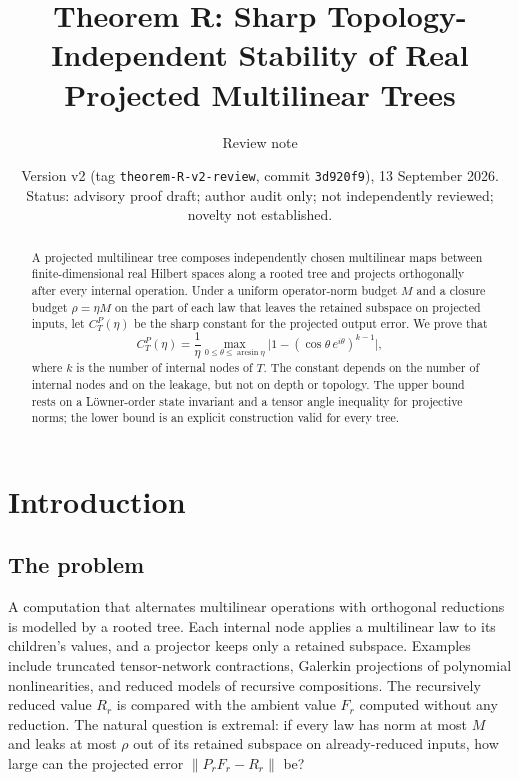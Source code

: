 \documentclass[11pt]{amsart}
\title[Theorem R]{Theorem R: Sharp Topology-Independent Stability of Real Projected Multilinear Trees}
\author{Review note}
\date{Version v2 (tag \texttt{theorem-R-v2-review}, commit \texttt{3d920f9}), 13 September 2026.
Status: advisory proof draft; author audit only; not independently reviewed; novelty not established.}
\theoremstyle{definition}
\newcommand{\norm}[1]{\lVert #1\rVert}
\begin{document}
\begin{abstract}
A projected multilinear tree composes independently chosen multilinear maps
between finite-dimensional real Hilbert spaces along a rooted tree and projects
orthogonally after every internal operation. Under a uniform operator-norm budget
$M$ and a closure budget $\rho=\eta M$ on the part of each law that leaves the
retained subspace on projected inputs, let $C^P_T(\eta)$ be the sharp constant for
the projected output error. We prove that
\[
C^P_T(\eta)=\frac1\eta\max_{0\le\theta\le\arcsin\eta}\bigl|1-(\cos\theta\,e^{i\theta})^{k-1}\bigr|,
\]
where $k$ is the number of internal nodes of $T$. The constant depends on the number
of internal nodes and on the leakage, but not on depth or topology. The upper bound
rests on a Löwner-order state invariant and a tensor angle inequality for projective
norms; the lower bound is an explicit construction valid for every tree.
\end{abstract}

\maketitle

\section*{Introduction}

\subsection*{The problem}
A computation that alternates multilinear operations with orthogonal reductions is
modelled by a rooted tree. Each internal node applies a multilinear law to its
children's values, and a projector keeps only a retained subspace. Examples include
truncated tensor-network contractions, Galerkin projections of polynomial
nonlinearities, and reduced models of recursive compositions. The recursively
reduced value $R_r$ is compared with the ambient value $F_r$ computed without any
reduction. The natural question is extremal: if every law has norm at most $M$ and
leaks at most $\rho$ out of its retained subspace on already-reduced inputs, how
large can the projected error $\norm{P_rF_r-R_r}$ be?
\end{document}
